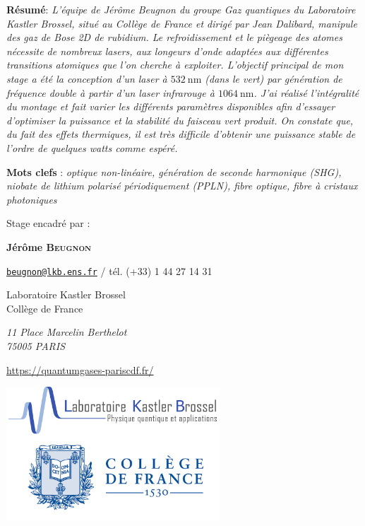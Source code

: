 \documentclass[11pt,a4paper]{article}
\newcommand{\lmbd}[1]{$\SI{#1}{\nano\metre}$}
\begin{document}
\begin{@empty}
\begin{center}
\parbox{15cm}{\small
	\textbf{R\'esum\'e}: \it L'équipe de Jérôme Beugnon du groupe Gaz quantiques du Laboratoire Kastler Brossel, situé au Collège de France et dirigé par Jean Dalibard, manipule des gaz de Bose 2D de rubidium. Le refroidissement et le piègeage des atomes nécessite de nombreux lasers, aux longeurs d'onde adaptées aux différentes transitions atomiques que l'on cherche à exploiter.
	L'objectif principal de mon stage a été la conception d'un laser à $\SI{532}{\nano\metre}$ (dans le vert) par génération de fréquence double à partir d'un laser infrarouge à \lmbd{1064}. J'ai réalisé l'intégralité du montage et fait varier les différents paramètres disponibles afin d'essayer d'optimiser la puissance et la stabilité du faisceau vert produit. On constate que, du fait des effets thermiques, il est très difficile d'obtenir une puissance stable de l'ordre de quelques watts comme espéré. 
\vspace{0.5cm}
} 


\vspace{0.25cm}

\parbox{15cm}{
\textbf{Mots clefs} : \it optique non-linéaire, génération de seconde harmonique (SHG), niobate de lithium polarisé périodiquement (PPLN), fibre optique, fibre à cristaux photoniques}%

\vspace{0.5cm}

\parbox{15cm}{
Stage encadr\'e par :

{\bf Jérôme \textsc{Beugnon}}

\href{mailto:beugnon@lkb.ens.fr}{\tt beugnon@lkb.ens.fr} / t\'el. (+33) 1 44 27 14 31


Laboratoire Kastler Brossel \\
Collège de France

{\it 11 Place Marcelin Berthelot \\
75005 PARIS}

\url{https://quantumgases-pariscdf.fr/}
} 

\vspace{0.5cm}

\includegraphics[height=5cm]{./img/logos_w_trans.png}


\end{center}
\end{@empty}
\end{document}
